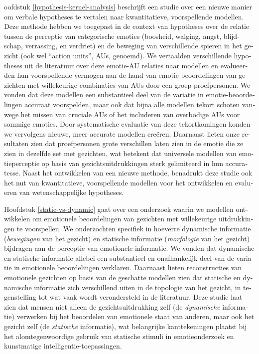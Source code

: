 \documentclass[12pt,american,a4paper,oneside,]{memoir} %
\newenvironment{dutch}[2][]{\begin{otherlanguage}{dutch}}{\end{otherlanguage}}
\begin{document}
\begin{dutch}
Hoofdstuk \ref{hypothesis-kernel-analysis} beschrijft een studie over een nieuwe manier om verbale hypotheses te vertalen naar kwantitatieve, voorspellende modellen. Deze methode hebben we toegepast in de context van hypotheses over de relatie tussen de perceptie van categorische emoties (boosheid, walging, angst, blijdschap, verrassing, en verdriet) en de beweging van verschillende spieren in het gezicht (ook wel ``action units'', AUs, genoemd). We vertaalden verschillende hypotheses uit de literatuur over deze emotie-AU relaties naar modellen en evalueerden hun voorspellende vermogen aan de hand van emotie-beoordelingen van gezichten met willekeurige combinaties van AUs door een groep proefpersonen. We vonden dat deze modellen een substantieel deel van de variatie in emotie-beoordelingen accuraat voorspelden, maar ook dat bijna alle modellen tekort schoten vanwege het missen van cruciale AUs of het includeren van overbodige AUs voor sommige emoties. Door systematische evaluatie van deze tekortkomingen konden we vervolgens nieuwe, meer accurate modellen creëren. Daarnaast lieten onze resultaten zien dat proefpersonen grote verschillen laten zien in de emotie die ze zien in dezelfde set met gezichten, wat betekent dat universele modellen van emotieperceptie op basis van gezichtsuitdrukkingen sterk gelimiteerd in hun accuratesse. Naast het ontwikkelen van een nieuwe methode, benadrukt deze studie ook het nut van kwantitatieve, voorspellende modellen voor het ontwikkelen en evalueren van wetenschappelijke hypotheses.

Hoofdstuk \ref{static-vs-dynamic} gaat over een onderzoek waarin we modellen ontwikkelen om emotionele beoordelingen van gezichten met willekeurige uitdrukkingen te voorspellen. We onderzochten specifiek in hoeverre dynamische informatie (\emph{bewegingen} van het gezicht) en statische informatie (\emph{morfologie} van het gezicht) bijdragen aan de perceptie van emotionele informatie. We vonden dat dynamische en statische informatie allebei een substantieel en onafhankelijk deel van de variatie in emotionele beoordelingen verklaren. Daarnaast lieten reconstructies van emotionele gezichten op basis van de geschatte modellen zien dat statische en dynamische informatie zich verschillend uiten in de topologie van het gezicht, in tegenstelling tot wat vaak wordt verondersteld in de literatuur. Deze studie laat zien dat mensen niet alleen de gezichtsuitdrukking zelf (de \emph{dynamische} informatie) verwerken bij het beoordelen van emotionele staat van anderen, maar ook het gezicht zelf (de \emph{statische} informatie), wat belangrijke kanttekeningen plaatst bij het alomtegenwoordige gebruik van statische stimuli in emotieonderzoek en kunstmatige intelligentie-toepassingen.


\end{dutch}
\end{document}
